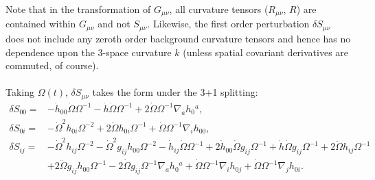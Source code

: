 \documentclass[10pt,letterpaper]{article}
\begin{document}
Note that in the transformation of $G_{\mu\nu}$, all curvature tensors ($R_{\mu\nu}$, $R$) are contained within $G_{\mu\nu}$ and not $S_{\mu\nu}$. Likewise, the first order perturbation $\delta S_{\mu\nu}$ does not include any zeroth order background curvature tensors and hence has no dependence upon the 3-space curvature $k$ (unless spatial covariant derivatives are commuted, of course). 
\\ \\
Taking $\Omega(t)$, $\delta S_{\mu\nu}$ takes the form under the 3+1 splitting:
\begin{align}
\delta S_{00}={}&- \dot{h}_{00} \dot{\Omega} \Omega^{-1}
 -  \dot{h} \dot{\Omega} \Omega^{-1}
 + 2 \dot{\Omega} \Omega^{-1} \nabla_{a}h_{0}{}^{a},
\\
\delta S_{0i}={}&- \dot{\Omega}^2 h_{0i} \Omega^{-2}
 + 2 \ddot{\Omega} h_{0i} \Omega^{-1}
 + \dot{\Omega} \Omega^{-1} \nabla_{i}h_{00},
\\
\delta S_{ij}={}&- \dot{\Omega}^2 h_{ij} \Omega^{-2}
 -  \dot{\Omega}^2 g_{ij} h_{00} \Omega^{-2}
 -  \dot{h}_{ij} \dot{\Omega} \Omega^{-1}
 + 2 \dot{h}_{00} \dot{\Omega} g_{ij} \Omega^{-1}
 + \dot{h} \dot{\Omega} g_{ij} \Omega^{-1}
 + 2 \ddot{\Omega} h_{ij} \Omega^{-1}\nonumber\\
& + 2 \ddot{\Omega} g_{ij} h_{00} \Omega^{-1}
 - 2 \dot{\Omega} g_{ij} \Omega^{-1} \nabla_{a}h_{0}{}^{a}
 + \dot{\Omega} \Omega^{-1} \nabla_{i}h_{0j}
 + \dot{\Omega} \Omega^{-1} \nabla_{j}h_{0i}.
\end{align}
\end{document}
